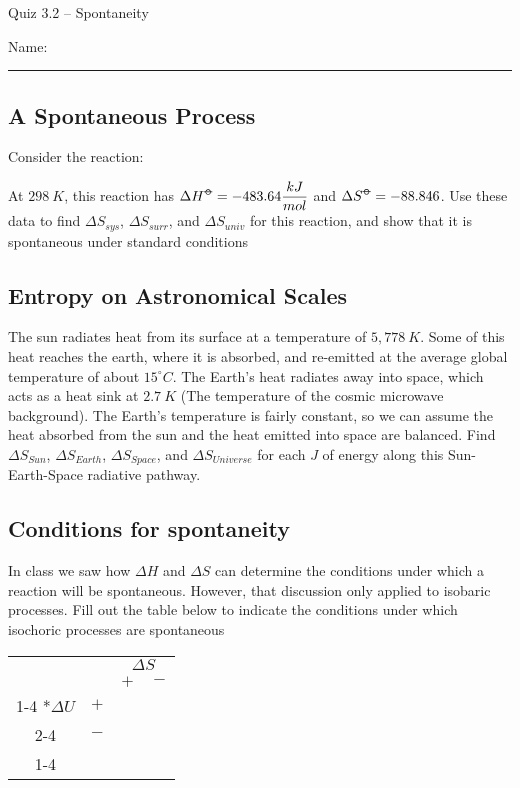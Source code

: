 \documentclass[11pt, letterpaper]{memoir}
\begin{document}
	\begin{center}
		{\large Quiz 3.2 -- Spontaneity}
	\end{center}
	{\large Name: \rule[-1mm]{4in}{.1pt} 

\subsection*{A Spontaneous Process}

Consider the reaction: 

\noindent
At $298~K$, this reaction has $\Delta H^{\std} = -483.64\dfrac{kJ}{mol}$ and $\Delta S^{\std}= -88.846$. Use these data to find $\Delta S_{sys}$, $\Delta S_{surr}$, and $\Delta S_{univ}$ for this reaction, and show that it is spontaneous under standard conditions

\vspace{4em}
\subsection*{Entropy on Astronomical Scales}
The sun radiates heat from its surface at a temperature of $5,778~K$. Some of this heat reaches the earth, where it is absorbed, and re-emitted at the average global temperature of about $15 ^\circ C$. The Earth's heat radiates away into space, which acts as a heat sink at $2.7~K$ (The temperature of the cosmic microwave background). The Earth's temperature is fairly constant, so we can assume the heat absorbed from the sun and the heat emitted into space are balanced. Find $\Delta S_{Sun}$, $\Delta S_{Earth}$, $\Delta S_{Space}$, and $\Delta S_{Universe}$ for each $J$ of energy along this Sun-Earth-Space radiative pathway.


\vspace{10em}
\subsection*{Conditions for spontaneity}
In class we saw how $\Delta H$ and $\Delta S$ can determine the conditions under which a reaction will be spontaneous. However, that discussion only applied to isobaric processes. Fill out the table below to indicate the conditions under which isochoric processes are spontaneous

\begin{center}
	\begin{tabular}{cc|c|c|}
		&&\multicolumn{2}{c|}{$\Delta S$} \\
		&& $+$ & $-$ \\ \cline{1-4}
		\multirow{2}*{$\Delta U$} &$+$&~\hspace{12em}~& ~\hspace{12em}~\\  \cline{2-4}
		&$-$&& \\ \cline{1-4}
		

\end{tabular}
\end{center}}
\end{document}
